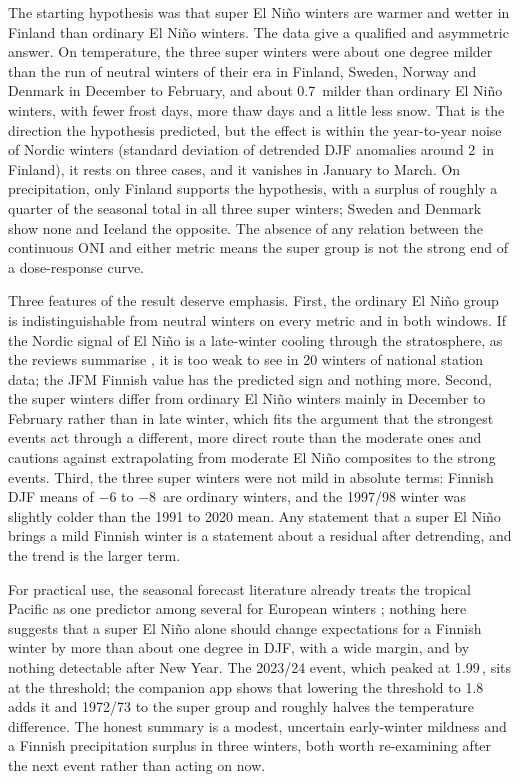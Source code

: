 The starting hypothesis was that super El Niño winters are warmer and wetter in Finland than ordinary El Niño winters. The data give a qualified and asymmetric answer. On temperature, the three super winters were about one degree milder than the run of neutral winters of their era in Finland, Sweden, Norway and Denmark in December to February, and about 0.7\,\degC{} milder than ordinary El Niño winters, with fewer frost days, more thaw days and a little less snow. That is the direction the hypothesis predicted, but the effect is within the year-to-year noise of Nordic winters (standard deviation of detrended DJF anomalies around 2\,\degC{} in Finland), it rests on three cases, and it vanishes in January to March. On precipitation, only Finland supports the hypothesis, with a surplus of roughly a quarter of the seasonal total in all three super winters; Sweden and Denmark show none and Iceland the opposite. The absence of any relation between the continuous ONI and either metric means the super group is not the strong end of a dose-response curve.

Three features of the result deserve emphasis. First, the ordinary El Niño group is indistinguishable from neutral winters on every metric and in both windows. If the Nordic signal of El Niño is a late-winter cooling through the stratosphere, as the reviews summarise \cite{bronnimann2007,ineson2009,domeisen2019}, it is too weak to see in 20 winters of national station data; the JFM Finnish value has the predicted sign and nothing more. Second, the super winters differ from ordinary El Niño winters mainly in December to February rather than in late winter, which fits the argument that the strongest events act through a different, more direct route than the moderate ones \cite{toniazzo2006,hardiman2019} and cautions against extrapolating from moderate El Niño composites to the strong events. Third, the three super winters were not mild in absolute terms: Finnish DJF means of $-6$ to $-8$\,\degC{} are ordinary winters, and the 1997/98 winter was slightly colder than the 1991 to 2020 mean. Any statement that a super El Niño brings a mild Finnish winter is a statement about a residual after detrending, and the trend is the larger term.

For practical use, the seasonal forecast literature already treats the tropical Pacific as one predictor among several for European winters \cite{scaife2014}; nothing here suggests that a super El Niño alone should change expectations for a Finnish winter by more than about one degree in DJF, with a wide margin, and by nothing detectable after New Year. The 2023/24 event, which peaked at 1.99\,\degC, sits at the threshold; the companion app shows that lowering the threshold to 1.8 adds it and 1972/73 to the super group and roughly halves the temperature difference. The honest summary is a modest, uncertain early-winter mildness and a Finnish precipitation surplus in three winters, both worth re-examining after the next event rather than acting on now.
